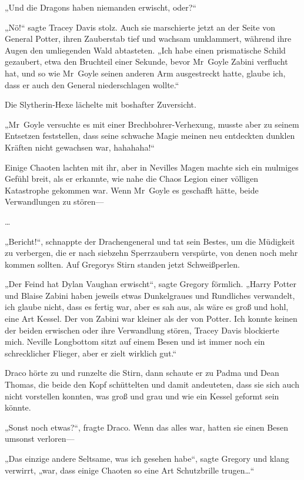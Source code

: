 {„Und die Dragons haben niemanden erwischt, oder?“

„Nö!“ sagte Tracey Davis stolz. Auch sie marschierte jetzt an der Seite von General Potter, ihren Zauberstab tief und wachsam umklammert, während ihre Augen den umliegenden Wald abtasteten. „Ich habe einen prismatische Schild gezaubert, etwa den Bruchteil einer Sekunde, bevor Mr~Goyle Zabini verflucht hat, und so wie Mr~Goyle seinen anderen Arm ausgestreckt hatte, glaube ich, dass er auch den General niederschlagen wollte.“

Die Slytherin-Hexe lächelte mit boshafter Zuversicht.

„Mr~Goyle versuchte es mit einer Brechbohrer-Verhexung, musste aber zu seinem Entsetzen feststellen, dass seine schwache Magie meinen neu entdeckten dunklen Kräften nicht gewachsen war, hahahaha!“

Einige Chaoten lachten mit ihr, aber in Nevilles Magen machte sich ein mulmiges Gefühl breit, als er erkannte, wie nahe die Chaos Legion einer völligen Katastrophe gekommen war. Wenn Mr~Goyle es geschafft hätte, beide Verwandlungen zu stören—

…

„Bericht!“, schnappte der Drachengeneral und tat sein Bestes, um die Müdigkeit zu verbergen, die er nach siebzehn Sperrzaubern verspürte, von denen noch mehr kommen sollten. Auf Gregorys Stirn standen jetzt Schweißperlen.

„Der Feind hat Dylan Vaughan erwischt“, sagte Gregory förmlich. „Harry Potter und Blaise Zabini haben jeweils etwas Dunkelgraues und Rundliches verwandelt, ich glaube nicht, dass es fertig war, aber es sah aus, als wäre es groß und hohl, eine Art Kessel. Der von Zabini war kleiner als der von Potter. Ich konnte keinen der beiden erwischen oder ihre Verwandlung stören, Tracey Davis blockierte mich. Neville Longbottom sitzt auf einem Besen und ist immer noch ein schrecklicher Flieger, aber er zielt wirklich gut.“

Draco hörte zu und runzelte die Stirn, dann schaute er zu Padma und Dean Thomas, die beide den Kopf schüttelten und damit andeuteten, dass sie sich auch nicht vorstellen konnten, was groß und grau und wie ein Kessel geformt sein könnte.

„Sonst noch etwas?“, fragte Draco. Wenn das alles war, hatten sie einen Besen umsonst verloren—

„Das einzige andere Seltsame, was ich gesehen habe“, sagte Gregory und klang verwirrt, „war, dass einige Chaoten so eine Art Schutzbrille trugen…“

}
